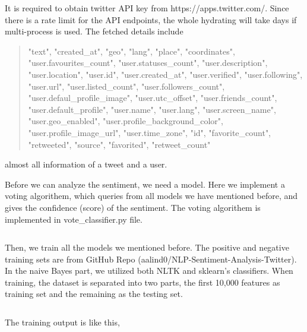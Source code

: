 \documentclass[12pt,a4paper]{article}
\begin{document}
    \inputminted[mathescape, linenos, numbersep=5pt, frame=lines, framesep=2mm, breaklines]{python}{../tweets_fetch.py}

    It is required to obtain twitter API key from https://apps.twitter.com/. Since there is a rate limit for the API endpoints, the whole hydrating will take days if multi-process is used. The fetched details include

    \begin{quotation}
      "text", "created\_at", "geo", "lang", "place", "coordinates", "user.favourites\_count", "user.statuses\_count", "user.description", "user.location", "user.id", "user.created\_at", "user.verified", "user.following", "user.url", "user.listed\_count", "user.followers\_count", "user.defaul_profile\_image", "user.utc\_offset", "user.friends\_count", "user.default\_profile", "user.name", "user.lang", "user.screen\_name", "user.geo\_enabled", "user.profile_background_color", "user.profile\_image\_url", "user.time\_zone", "id", "favorite\_count", "retweeted", "source", "favorited", "retweet\_count"
    \end{quotation}

    almost all information of a tweet and a user.

    Before we can analyze the sentiment, we need a model. Here we implement a voting algorithem, which queries from all models we have mentioned before, and gives the confidence (score) of the sentiment. The voting algorithem is implemented in vote_classifier.py file.

    \inputminted[mathescape, linenos, numbersep=5pt, frame=lines, framesep=2mm, breaklines]{python}{../vote_classifier.py}

    Then, we train all the models we mentioned before. The positive and negative training sets are from GitHub Repo (aalind0/NLP-Sentiment-Analysis-Twitter). In the naive Bayes part, we utilized both NLTK and sklearn's classifiers. When training, the dataset is separated into two parts, the first 10,000 features as training set and the remaining as the testing set.

    \inputminted[mathescape, linenos, numbersep=5pt, frame=lines, framesep=2mm, breaklines]{python}{../train_classifiers.py}

    The training output is like this,
\end{document}
